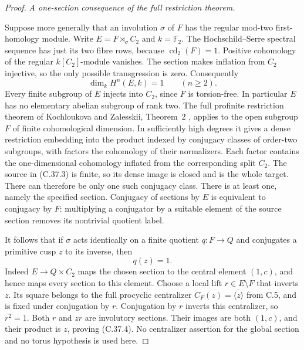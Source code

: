 \begin{proof}
\emph{A one-section consequence of the full restriction theorem.}\par
Suppose more generally that an involution \(\sigma\) of
\(F\) has the regular mod-two first-homology module.
Write \(E=F\rtimes_\sigma C_2\) and \(k=\mathbb F_2\).
The Hochschild--Serre spectral sequence has just its two fibre
rows, because \(\operatorname{cd}_2(F)=1\). Positive
cohomology of the regular \(k[C_2]\)-module vanishes.
The section makes inflation from \(C_2\) injective, so the
only possible transgression is zero. Consequently
\[
                      \dim_k H^n(E,k)=1\qquad(n\geq2).
 \tag{C.37.3}
\]
Every finite subgroup of \(E\) injects into \(C_2\),
since \(F\) is torsion-free. In particular \(E\) has no
elementary abelian subgroup of rank two. The full profinite
restriction theorem of Kochloukova and Zalesskii, Theorem~2
\cite{CEKochloukovaZalesskii2007}, applies to the open
subgroup \(F\) of finite cohomological dimension. In sufficiently
high degrees it gives a dense restriction embedding into the
product indexed by conjugacy classes of order-two subgroups,
with factors the cohomology of their normalizers. Each factor
contains the one-dimensional cohomology inflated from the
corresponding split \(C_2\). The source in (C.37.3) is finite,
so its dense image is closed and is the whole target. There
can therefore be only one such conjugacy class. There is at
least one, namely the specified section. Conjugacy of sections
by \(E\) is equivalent to conjugacy by \(F\): multiplying
a conjugator by a suitable element of the source section removes
its nontrivial quotient label.

It follows that if \(\sigma\) acts identically on a finite
quotient \(q:F\to Q\) and conjugates a primitive cusp \(z\)
to its inverse, then
\[
                              q(z)=1.
 \tag{C.37.4}
\]
Indeed \(E\to Q\times C_2\) maps the chosen section to
the central element \((1,c)\), and hence maps every section
to this element. Choose a local lift \(r\in E\setminus F\)
that inverts \(z\). Its square belongs to the full procyclic
centralizer \(C_F(z)=\overline{\langle z\rangle}\) from
C.5, and is fixed under conjugation by \(r\). Conjugation by
\(r\) inverts this centralizer, so \(r^2=1\).
Both \(r\) and \(zr\) are involutory sections. Their
images are both \((1,c)\), and their product is \(z\),
proving (C.37.4). No centralizer assertion for the global
section and no torus hypothesis is used here.


\end{proof}
